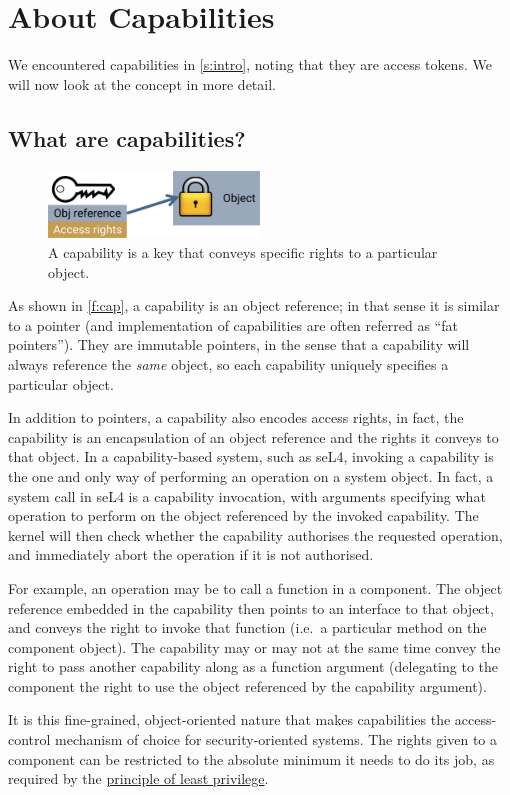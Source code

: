 \documentclass[english,a4paper,12pt]{report}
\newcommand{\Sect}[1]{\section{#1}}
\newcommand{\SSect}[1]{\subsection{#1}}
\newcommand{\Sect}[1]{\chapter{#1}}
\newcommand{\SSect}[1]{\section{#1}}
\begin{document}
  \Sect{About Capabilities}\label{s:caps}

  We encountered capabilities in \autoref{s:intro}, noting that they are
  access tokens. We will now look at the concept in more detail.

  \SSect{What are capabilities?}

  \begin{figure}[ht]
    \centering
    \includegraphics[width=0.5\textwidth]{cap}
    \caption[Capabilities are keys to objects]{A capability is a key
      that conveys specific rights to a particular object.}
    \label{f:cap}
  \end{figure}

  As shown in \autoref{f:cap}, a capability is an object reference; in
  that sense it is similar to a pointer (and implementation of
  capabilities are often referred as ``fat pointers''). They are
  immutable pointers, in the sense that a capability will always
  reference the \emph{same} object, so each capability uniquely
  specifies a particular object.

  In addition to pointers, a capability also encodes access rights, in
  fact, the capability is an encapsulation of an object reference and
  the rights it conveys to that object. In a capability-based system,
  such as seL4, invoking a capability is the one and only way of
  performing an operation on a system object. In fact, a system call
  in seL4 is a capability invocation, with arguments specifying what
  operation to perform on the object referenced by the invoked
  capability. The kernel will then check whether the capability
  authorises the requested operation, and immediately abort the
  operation if it is not authorised.

  For example, an operation may be to call a function in a
  component. The object reference embedded in the capability then
  points to an interface to that object, and conveys the right to
  invoke that function (i.e.\ a particular method on the component
  object). The capability may or may not at the same time
  convey the right to pass another capability along as a function
  argument (delegating to the component the right to use the object
  referenced by the capability argument).

  It is this fine-grained, object-oriented nature that makes
  capabilities the access-control mechanism of choice for
  security-oriented systems. The rights given to a component can be
  restricted to the absolute minimum it needs to do its job, as
  required by the
  \href{https://en.wikipedia.org/wiki/Principle_of_least_privilege}{principle
    of least privilege}.
\end{document}
